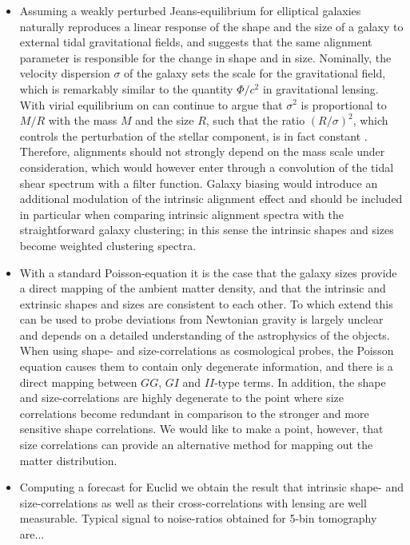 \documentclass[a4paper,fleqn,usenatbib]{mnras}
\begin{document}
\begin{itemize}
\item{Assuming a weakly perturbed Jeans-equilibrium for elliptical galaxies naturally reproduces a linear response of the shape and the size of a galaxy to external tidal gravitational fields, and suggests that the same alignment parameter is responsible for the change in shape and in size. Nominally, the velocity dispersion $\sigma$ of the galaxy sets the scale for the gravitational field, which is remarkably similar to the quantity $\Phi/c^2$ in gravitational lensing. With virial equilibrium on can continue to argue that $\sigma^2$ is proportional to $M/R$ with the mass $M$ and the size $R$, such that the ratio $(R/\sigma)^2$, which controls the perturbation of the stellar component, is in fact constant \citep[compare][]{piras_mass_2018}. Therefore, alignments should not strongly depend on the mass scale under consideration, which would however enter through a convolution of the tidal shear spectrum with a filter function. Galaxy biasing would introduce an additional modulation of the intrinsic alignment effect and should be included in particular when comparing intrinsic alignment spectra with the straightforward galaxy clustering; in this sense the intrinsic shapes and sizes become weighted clustering spectra.}

\item{With a standard Poisson-equation it is the case that the galaxy sizes provide a direct mapping of the ambient matter density, and that the intrinsic and extrinsic shapes and sizes are consistent to each other. To which extend this can be used to probe deviations from Newtonian gravity is largely unclear and depends on a detailed understanding of the astrophysics of the objects. When using shape- and size-correlations as cosmological probes, the Poisson equation causes them to contain only degenerate information, and there is a direct mapping between $GG$, $GI$ and $II$-type terms. In addition, the shape and size-correlations are highly degenerate to the point where size correlations become redundant in comparison to the stronger and more sensitive shape correlations. We would like to make a point, however, that size correlations can provide an alternative method for mapping out the matter distribution.}

\item{Computing a forecast for Euclid we obtain the result that intrinsic shape- and size-correlations as well as their cross-correlations with lensing are well measurable. Typical signal to noise-ratios obtained for 5-bin tomography are...}

\end{itemize}
\end{document}
